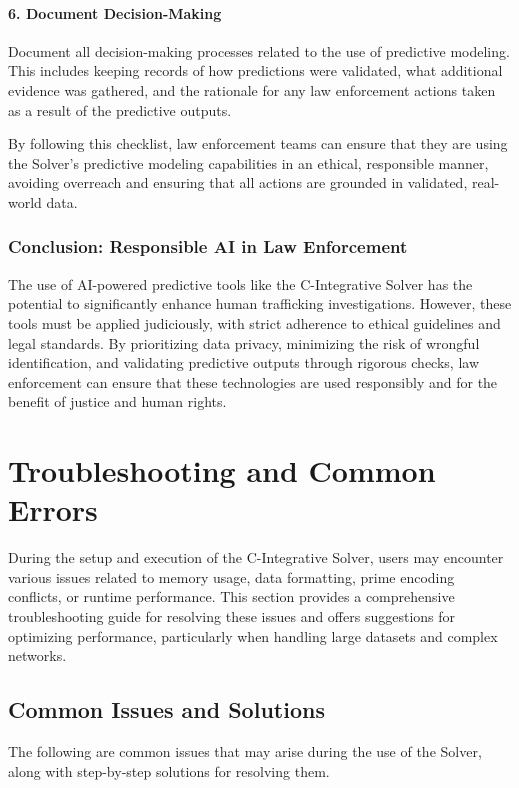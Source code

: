 \documentclass[%
 preprint, linenumbers,
 amsmath,amssymb,
 aps, physrev,
]{revtex4-2}
\begin{document}
\paragraph{6. Document Decision-Making}
Document all decision-making processes related to the use of predictive modeling. This includes keeping records of how predictions were validated, what additional evidence was gathered, and the rationale for any law enforcement actions taken as a result of the predictive outputs.

By following this checklist, law enforcement teams can ensure that they are using the Solver’s predictive modeling capabilities in an ethical, responsible manner, avoiding overreach and ensuring that all actions are grounded in validated, real-world data.

\subsubsection{Conclusion: Responsible AI in Law Enforcement}

The use of AI-powered predictive tools like the C-Integrative Solver has the potential to significantly enhance human trafficking investigations. However, these tools must be applied judiciously, with strict adherence to ethical guidelines and legal standards. By prioritizing data privacy, minimizing the risk of wrongful identification, and validating predictive outputs through rigorous checks, law enforcement can ensure that these technologies are used responsibly and for the benefit of justice and human rights.
\section{Troubleshooting and Common Errors}

During the setup and execution of the C-Integrative Solver, users may encounter various issues related to memory usage, data formatting, prime encoding conflicts, or runtime performance. This section provides a comprehensive troubleshooting guide for resolving these issues and offers suggestions for optimizing performance, particularly when handling large datasets and complex networks.

\subsection{Common Issues and Solutions}

The following are common issues that may arise during the use of the Solver, along with step-by-step solutions for resolving them.
\end{document}
